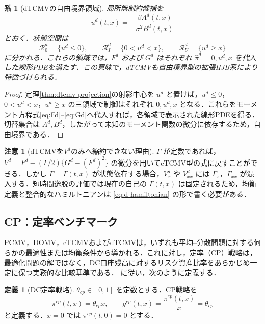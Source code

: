\documentclass[10pt,a4paper]{article}
\theoremstyle{plain}
\newtheorem{corollary}{系}
\theoremstyle{definition}
\newtheorem{definition}{定義}
\newtheorem{remark}{注意}
\begin{document}
\begin{corollary}[dTCMVの自由境界領域]
局所無制約候補を
\[
  u^d(t,x)=-\frac{\beta A^d(t,x)}{\sigma^2B^d(t,x)}
\]
とおく．状態空間は
\[
  \mathcal R_0^d=\{u^d\leq0\},\qquad
  \mathcal R_I^d=\{0<u^d<x\},\qquad
  \mathcal R_U^d=\{u^d\geq x\}
\]
に分かれる．これらの領域では，$F^d$ および $G^d$ はそれぞれ $\hat\pi^d=0,u^d,x$ を代入した線形PDEを満たす．この意味で，dTCMVも自由境界型の拡張HJB系により特徴づけられる．
\end{corollary}

\begin{proof}
定理\ref{thm:dtcmv-projection}の射影中心を $u^d$ と置けば，$u^d\leq0$，$0<u^d<x$，$u^d\geq x$ の三領域で制御はそれぞれ $0,u^d,x$ となる．これらをモーメント方程式\eqref{eq:Fd}--\eqref{eq:Gd}へ代入すれば，各領域で表示された線形PDEを得る．切替集合は $A^d,B^d$，したがって未知のモーメント関数の微分に依存するため，自由境界である．
\end{proof}

\begin{remark}[dTCMVを$V^d$のみへ縮約できない理由]
$\Gamma$ が定数であれば，$V^d=F^d-(\Gamma/2)\{G^d-(F^d)^2\}$ の微分を用いてcTCMV型の式に戻すことができる．しかし $\Gamma=\Gamma(t,x)$ が状態依存する場合，$V_x^d$ や $V_{xx}^d$ には $\Gamma_x$，$\Gamma_{xx}$ が混入する．短時間逸脱の評価では現在の自己の $\Gamma(t,x)$ は固定されるため，均衡定義と整合的なハミルトニアンは \eqref{eq:d-hamiltonian} の形で書く必要がある．
\end{remark}


\subsection{CP：定率ベンチマーク}
\label{sec:cp-benchmark}

PCMV，DOMV，cTCMVおよびdTCMVは，いずれも平均--分散問題に対する何らかの最適性または均衡条件から導かれる．これに対し，定率（CP）戦略は，最適化問題の解ではなく，DC口座残高に対するリスク資産比率をあらかじめ一定に保つ実務的な比較基準である．\citet{vanStadenDangForsyth2021} に従い，次のように定義する．

\begin{definition}[DC定率戦略]
\label{def:cp}
$\theta_{cp}\in[0,1]$ を定数とする．CP戦略を
\begin{equation}
  \pi^{cp}(t,x)=\theta_{cp}x,
  \qquad
  g^{cp}(t,x)=\frac{\pi^{cp}(t,x)}{x}=\theta_{cp}
  \label{eq:cp-policy}
\end{equation}
と定義する．$x=0$ では $\pi^{cp}(t,0)=0$ とする．
\end{definition}
\end{document}
